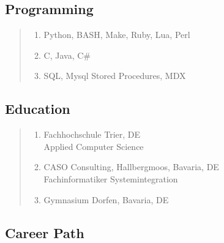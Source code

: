 \documentclass[a4paper]{report}
\begin{document}
\subsection*{Programming}

\begin{quote}

\begin{enumerate}

\item[Scripting]    Python, BASH, Make, Ruby, Lua, Perl

\item[Languages]    C, Java, C\#

\item[BI]           SQL, Mysql Stored Procedures, MDX

\end{enumerate}

\end{quote}

\begin{flushleft}
\section*{Education}
\end{flushleft}

\begin{quote}
\begin{enumerate}

\item[2004 - 2007]  Fachhochschule Trier, DE\\
                    Applied Computer Science

\item[1997 - 1999]  CASO Consulting, Hallbergmoos, Bavaria, DE\\
                    Fachinformatiker Systemintegration

\item[1996]         Gymnasium Dorfen, Bavaria, DE

\end{enumerate}
\end{quote}

\clearpage

\begin{flushleft}
\section*{Career Path}
\end{flushleft}
\end{document}

